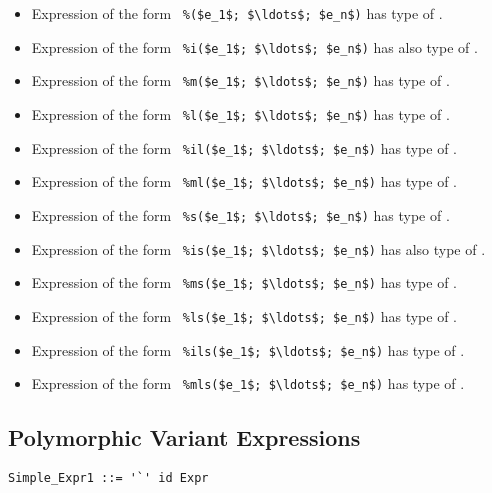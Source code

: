 \begin{itemize}
  \item Expression of the form ~\lstinline!%($e_1$; $\ldots$; $e_n$)!
    has type of . 
  \item Expression of the form ~\lstinline!%i($e_1$; $\ldots$; $e_n$)!
    has also type of . 
  \item Expression of the form ~\lstinline!%m($e_1$; $\ldots$; $e_n$)!
    has type of .
  \item Expression of the form ~\lstinline!%l($e_1$; $\ldots$; $e_n$)!
    has type of . 
  \item Expression of the form ~\lstinline!%il($e_1$; $\ldots$; $e_n$)!
    has type of . 
  \item Expression of the form ~\lstinline!%ml($e_1$; $\ldots$; $e_n$)!
    has type of .
  \item Expression of the form ~\lstinline!%s($e_1$; $\ldots$; $e_n$)!
    has type of . 
  \item Expression of the form ~\lstinline[deletekeywords={is}]!%is($e_1$; $\ldots$; $e_n$)!
    has also type of . 
  \item Expression of the form ~\lstinline!%ms($e_1$; $\ldots$; $e_n$)!
    has type of .
  \item Expression of the form ~\lstinline!%ls($e_1$; $\ldots$; $e_n$)!
    has type of . 
  \item Expression of the form ~\lstinline!%ils($e_1$; $\ldots$; $e_n$)!
    has type of . 
  \item Expression of the form ~\lstinline!%mls($e_1$; $\ldots$; $e_n$)!
    has type of .
\end{itemize}





\subsection{Polymorphic Variant Expressions}
\label{sec:polymorphic-variant-expressions}

\syntax\begin{lstlisting}
Simple_Expr1 ::= '`' id Expr
\end{lstlisting}


